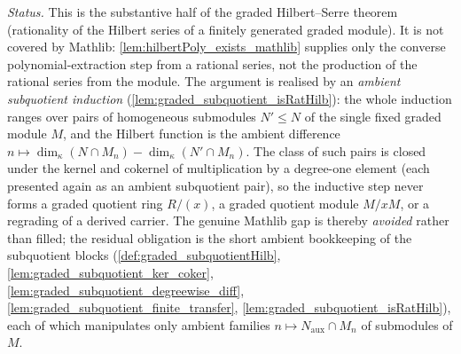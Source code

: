 \begin{lemma}
  \emph{Status.} This is the substantive half of the graded Hilbert--Serre
  theorem (rationality of the Hilbert series of a finitely generated graded
  module). It is not covered by Mathlib: \cref{lem:hilbertPoly_exists_mathlib}
  supplies only the converse polynomial-extraction step from a rational series, not
  the production of the rational series from the module. The argument is realised by
  an \emph{ambient subquotient induction} (\cref{lem:graded_subquotient_isRatHilb}):
  the whole induction ranges over pairs of homogeneous submodules \(N' \le N\) of the
  single fixed graded module \(M\), and the Hilbert function is the ambient difference
  \(n \mapsto \dim_\kappa(N \cap M_n) - \dim_\kappa(N' \cap M_n)\). The class of such
  pairs is closed under the kernel and cokernel of multiplication by a degree-one
  element (each presented again as an ambient subquotient pair), so the inductive step
  never forms a graded quotient ring \(R/(x)\), a graded quotient module \(M/xM\), or a
  regrading of a derived carrier. The genuine Mathlib gap is thereby \emph{avoided}
  rather than filled; the residual obligation is the short ambient bookkeeping of the
  subquotient blocks (\cref{def:graded_subquotientHilb},
  \cref{lem:graded_subquotient_ker_coker},
  \cref{lem:graded_subquotient_degreewise_diff},
  \cref{lem:graded_subquotient_finite_transfer},
  \cref{lem:graded_subquotient_isRatHilb}), each of which manipulates only ambient
  families \(n \mapsto N_{\mathrm{aux}} \cap M_n\) of submodules of \(M\).
\end{lemma}

